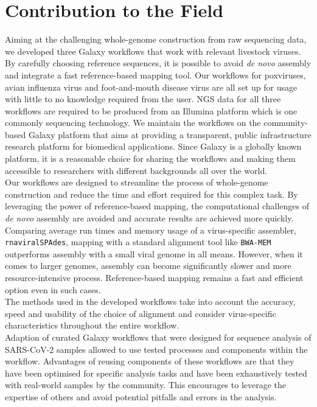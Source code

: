 \section{Contribution to the Field}
Aiming at the challenging whole-genome construction from raw sequencing data, we developed three Galaxy workflows that work with relevant livestock viruses. By carefully choosing reference sequences, it is possible to avoid \textit{de novo} assembly and integrate a fast reference-based mapping tool. Our workflows for poxviruses, avian influenza virus and foot-and-mouth disease virus are all set up for usage with little to no knowledge required from the user. NGS data for all three workflows are required to be produced from an Illumina platform which is one commonly sequencing technology. We maintain the workflows on the community-based Galaxy platform that aims at providing a transparent, public infrastructure research platform for biomedical applications. Since Galaxy is a globally known platform, it is a reasonable choice for sharing the workflows and making them accessible to researchers with different backgrounds all over the world.\\
Our workflows are designed to streamline the process of whole-genome construction and reduce the time and effort required for this complex task. By leveraging the power of reference-based mapping, the computational challenges of \textit{de novo} assembly are avoided and accurate results are achieved more quickly. Comparing average run times and memory usage of a virus-specific assembler, \texttt{rnaviralSPAdes}, mapping with a standard alignment tool like \texttt{BWA-MEM} outperforms assembly with a small viral genome in all means. However, when it comes to larger genomes, assembly can become significantly slower and more resource-intensive process. Reference-based mapping remains a fast and efficient option even in such cases.\\
The methods used in the developed workflows take into account the accuracy, speed and usability of the choice of alignment and consider virus-specific characteristics throughout the entire workflow.\\
Adaption of curated Galaxy workflows that were designed for sequence analysis of \ac{SARS-CoV-2} samples allowed to use tested processes and components within the workflow. Advantages of reusing components of these workflows are that they have been optimised for specific analysis tasks and have been exhaustively tested with real-world samples by the community. This encourages to leverage the expertise of others and avoid potential pitfalls and errors in the analysis.

